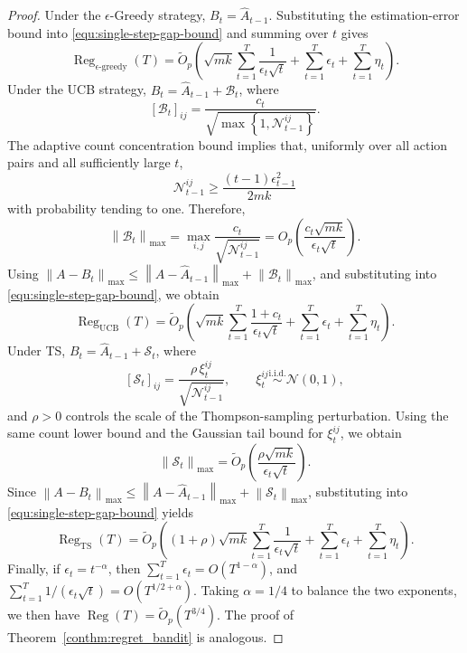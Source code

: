 \documentclass[12pt]{article}
\begin{document}
\begin{proof}
Under the $\epsilon$-Greedy strategy, $B_t = \widehat A_{t-1}$. Substituting the estimation-error bound into
\eqref{equ:single-step-gap-bound} and summing over $t$ gives
\[
\operatorname{Reg}_{\epsilon\text{-greedy}}(T)
=
\widetilde O_p
\left(
\sqrt{mk}
\sum_{t=1}^T
\frac{1}{\epsilon_t\sqrt t}
+
\sum_{t=1}^T
\epsilon_t
+
\sum_{t=1}^T
\eta_t
\right).
\]
Under the UCB strategy, $B_t = \widehat A_{t-1} + \mathcal B_t$,
where
\[
[\mathcal B_t]_{ij}
=
\frac{c_t}{\sqrt{\max\left\{1,\mathcal N_{t-1}^{ij}\right\}}}.
\]
The adaptive count concentration bound implies that, uniformly over all action
pairs and all sufficiently large $t$,
\[
\mathcal N_{t-1}^{ij}
\ge
\frac{
(t-1)\epsilon_{t-1}^2
}{
2mk
}
\]
with probability tending to one. Therefore,
\[
\left\|
\mathcal B_t
\right\|_{\max}
=
\max_{i,j}
\frac{c_t}{\sqrt{\mathcal N_{t-1}^{ij}}}
= O_p
\left(
\frac{c_t\sqrt{mk}}{\epsilon_t\sqrt t}
\right).
\]
Using $\left\|
A-B_t
\right\|_{\max}
\le
\left\|
A-\widehat A_{t-1}
\right\|_{\max}
+ \left\|
\mathcal B_t
\right\|_{\max}$,
and substituting into
\eqref{equ:single-step-gap-bound}, we obtain
\[
\operatorname{Reg}_{\mathrm{UCB}}(T)
=
\widetilde O_p
\left(
\sqrt{mk}
\sum_{t=1}^T
\frac{1+c_t}{\epsilon_t\sqrt t}
+
\sum_{t=1}^T
\epsilon_t
+
\sum_{t=1}^T
\eta_t
\right).
\]
Under TS, $B_t = \widehat A_{t-1} + \mathcal S_t$,
where
\[
[\mathcal S_t]_{ij}
= \frac{\rho\,\xi_t^{ij}}{\sqrt{\mathcal N_{t-1}^{ij}}},
\qquad
\xi_t^{ij}
\stackrel{\mathrm{i.i.d.}}{\sim}
\mathcal N(0,1),
\]
and $\rho>0$ controls the scale of the Thompson-sampling perturbation.
Using the same count lower bound and the Gaussian tail bound for
$\xi_t^{ij}$, we obtain
\[
\left\|
\mathcal S_t
\right\|_{\max}
=
\widetilde O_p
\left(
\frac{\rho\sqrt{mk}}{\epsilon_t\sqrt t}
\right).
\]
Since $\left\|
A-B_t
\right\|_{\max}
\le
\left\|
A-\widehat A_{t-1}
\right\|_{\max}
+
\left\|
\mathcal S_t
\right\|_{\max}$,
substituting into
\eqref{equ:single-step-gap-bound} yields
\[
\operatorname{Reg}_{\mathrm{TS}}(T)
=
\widetilde O_p
\left(
(1+\rho)
\sqrt{mk}
\sum_{t=1}^T
\frac{1}{\epsilon_t\sqrt t}
+
\sum_{t=1}^T
\epsilon_t
+
\sum_{t=1}^T
\eta_t
\right).
\]
Finally, if $\epsilon_t=t^{-\alpha}$, then $\sum_{t=1}^T
\epsilon_t
=
O\left(
T^{1-\alpha}
\right)$,
and $\sum_{t=1}^T
{1}/(\epsilon_t\sqrt t) =
O\left(T^{1/2+\alpha} \right)$.
Taking $\alpha=1/4$ to balance the two exponents, we then have $\operatorname{Reg}(T) = \widetilde O_p \left( T^{3/4} \right)$.
The proof of Theorem~\ref{conthm:regret_bandit} is analogous.
\end{proof}
\end{document}
